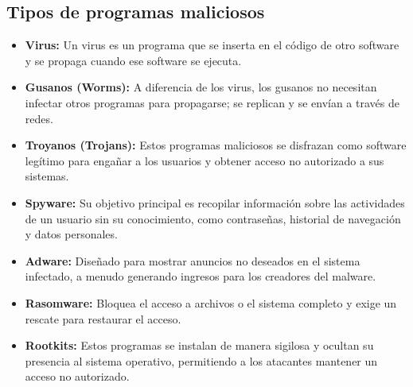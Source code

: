 \subsection{Tipos de programas maliciosos}
\begin{tcolorbox}
	\begin{itemize}
		
		
		\item \textbf{Virus:}
		 Un virus es un programa que se inserta en el código de otro software y se propaga cuando ese software se ejecuta.
		\item \textbf{Gusanos (Worms):}
		A diferencia de los virus, los gusanos no necesitan infectar otros programas para propagarse; se replican y se envían a través de redes.
		\item \textbf{Troyanos (Trojans):}
		Estos programas maliciosos se disfrazan como software legítimo para engañar a los usuarios y obtener acceso no autorizado a sus sistemas.
		\item \textbf{Spyware:}
		Su objetivo principal es recopilar información sobre las actividades de un usuario sin su conocimiento, como contraseñas, historial de navegación y datos personales.
		\item \textbf{Adware:}
		Diseñado para mostrar anuncios no deseados en el sistema infectado, a menudo generando ingresos para los creadores del malware.
		\item \textbf{Rasomware:}
		Bloquea el acceso a archivos o el sistema completo y exige un rescate para restaurar el acceso.
		\item \textbf{Rootkits:}
		 Estos programas se instalan de manera sigilosa y ocultan su presencia al sistema operativo, permitiendo a los atacantes mantener un acceso no autorizado.
	\end{itemize}
\end{tcolorbox}
